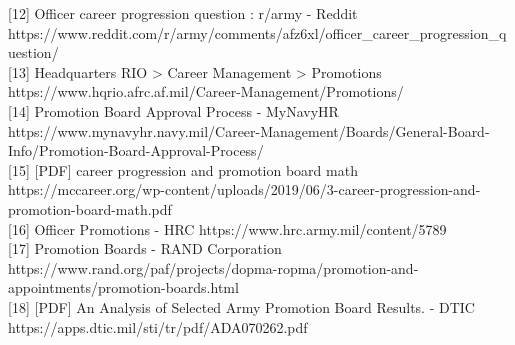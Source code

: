 \documentclass[
  letterpaper,
  DIV=11,
  numbers=noendperiod]{scrartcl}
\begin{document}
{[}12{]} Officer career progression question : r/army - Reddit
https://www.reddit.com/r/army/comments/afz6xl/officer\_career\_progression\_question/\\
{[}13{]} Headquarters RIO \textgreater{} Career Management
\textgreater{} Promotions
https://www.hqrio.afrc.af.mil/Career-Management/Promotions/\\
{[}14{]} Promotion Board Approval Process - MyNavyHR
https://www.mynavyhr.navy.mil/Career-Management/Boards/General-Board-Info/Promotion-Board-Approval-Process/\\
{[}15{]} {[}PDF{]} career progression and promotion board math
https://mccareer.org/wp-content/uploads/2019/06/3-career-progression-and-promotion-board-math.pdf\\
{[}16{]} Officer Promotions - HRC
https://www.hrc.army.mil/content/5789\\
{[}17{]} Promotion Boards - RAND Corporation
https://www.rand.org/paf/projects/dopma-ropma/promotion-and-appointments/promotion-boards.html\\
{[}18{]} {[}PDF{]} An Analysis of Selected Army Promotion Board Results.
- DTIC https://apps.dtic.mil/sti/tr/pdf/ADA070262.pdf\\
\end{document}
